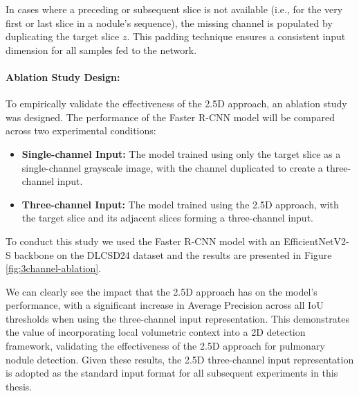 In cases where a preceding or subsequent slice is not available (i.e., for the very first or last slice in a nodule's sequence), the missing channel is populated by duplicating the target slice $z$. This padding technique ensures a consistent input dimension for all samples fed to the network.

\paragraph{Ablation Study Design:}
To empirically validate the effectiveness of the 2.5D approach, an ablation study was designed. The performance of the Faster R-CNN model will be compared across two experimental conditions:
\begin{itemize}
    \item \textbf{Single-channel Input:} The model trained using only the target slice as a single-channel grayscale image, with the channel duplicated to create a three-channel input.
    \item \textbf{Three-channel Input:} The model trained using the 2.5D approach, with the target slice and its adjacent slices forming a three-channel input. 
\end{itemize}
To conduct this study we used the Faster R-CNN model with an EfficientNetV2-S backbone on the DLCSD24 dataset and the results are presented in Figure \ref{fig:3channel-ablation}.



We can clearly see the impact that the 2.5D approach has on the model's performance, with a significant increase in Average Precision across all IoU thresholds when using the three-channel input representation. This demonstrates the value of incorporating local volumetric context into a 2D detection framework, validating the effectiveness of the 2.5D approach for pulmonary nodule detection. Given these results, the 2.5D three-channel input representation is adopted as the standard input format for all subsequent experiments in this thesis.

